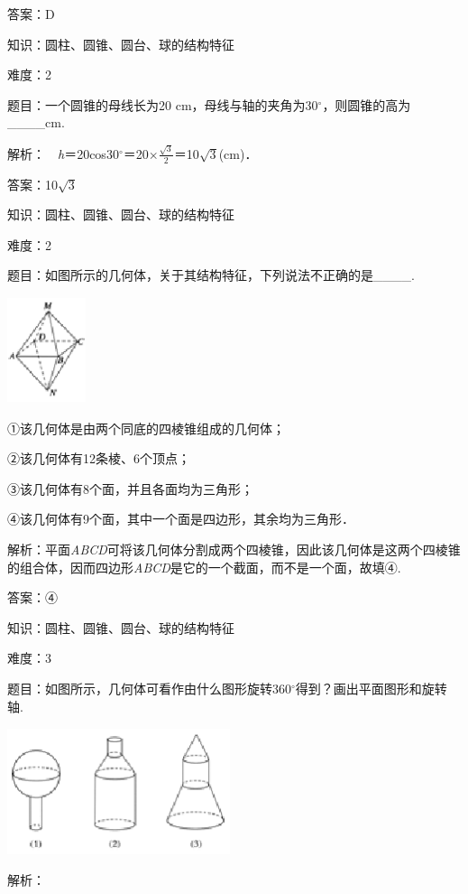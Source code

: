 \documentclass{article} %
\begin{document}
答案：D

知识：圆柱、圆锥、圆台、球的结构特征

难度：2

题目：一个圆锥的母线长为20 cm，母线与轴的夹角为30$\mathrm{{}^\circ}$，则圆锥的高为\_\_\_\_cm.

解析：　\textit{h}＝20cos30$\mathrm{{}^\circ}$＝20$\mathrm{\times}\frac{\sqrt{3}}{2}$＝10$\sqrt{3}$(cm)．

答案：10$\sqrt{3}$

知识：圆柱、圆锥、圆台、球的结构特征

难度：2

题目：如图所示的几何体，关于其结构特征，下列说法不正确的是\_\_\_\_.

\includegraphics*[width=0.91in, height=1.22in, keepaspectratio=false]{image23}

①该几何体是由两个同底的四棱锥组成的几何体；

②该几何体有12条棱、6个顶点；

③该几何体有8个面，并且各面均为三角形；

④该几何体有9个面，其中一个面是四边形，其余均为三角形．

解析：平面\textit{ABCD}可将该几何体分割成两个四棱锥，因此该几何体是这两个四棱锥的组合体，因而四边形\textit{ABCD}是它的一个截面，而不是一个面，故填④.

答案：④

知识：圆柱、圆锥、圆台、球的结构特征

难度：3

题目：如图所示，几何体可看作由什么图形旋转360$\mathrm{{}^\circ}$得到？画出平面图形和旋转轴.

\includegraphics*[width=2.57in, height=1.46in, keepaspectratio=false]{image24}

解析：
\end{document}
